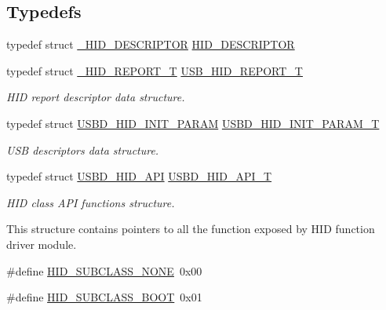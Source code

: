 \subsection*{Typedefs}
\begin{DoxyCompactItemize}
\item 
typedef struct \hyperlink{struct__HID__DESCRIPTOR}{\-\_\-\-H\-I\-D\-\_\-\-D\-E\-S\-C\-R\-I\-P\-T\-O\-R} \hyperlink{group__USBD__HID_ga683d4339556ecbba7d2062c3f90336e8}{H\-I\-D\-\_\-\-D\-E\-S\-C\-R\-I\-P\-T\-O\-R}
\item 
typedef struct \hyperlink{struct__HID__REPORT__T}{\-\_\-\-H\-I\-D\-\_\-\-R\-E\-P\-O\-R\-T\-\_\-\-T} \hyperlink{group__USBD__HID_gaaa1686adb431783ea4357e6899c0d39d}{U\-S\-B\-\_\-\-H\-I\-D\-\_\-\-R\-E\-P\-O\-R\-T\-\_\-\-T}
\begin{DoxyCompactList}\small\item\em H\-I\-D report descriptor data structure. \end{DoxyCompactList}\item 
typedef struct \hyperlink{structUSBD__HID__INIT__PARAM}{U\-S\-B\-D\-\_\-\-H\-I\-D\-\_\-\-I\-N\-I\-T\-\_\-\-P\-A\-R\-A\-M} \hyperlink{group__USBD__HID_ga192251fa5ec461eaa9a77b76dbe7c3fa}{U\-S\-B\-D\-\_\-\-H\-I\-D\-\_\-\-I\-N\-I\-T\-\_\-\-P\-A\-R\-A\-M\-\_\-\-T}
\begin{DoxyCompactList}\small\item\em U\-S\-B descriptors data structure. \end{DoxyCompactList}\item 
typedef struct \hyperlink{structUSBD__HID__API}{U\-S\-B\-D\-\_\-\-H\-I\-D\-\_\-\-A\-P\-I} \hyperlink{group__USBD__HID_ga48d7b7f66a852d99dfbe2c419cc408ba}{U\-S\-B\-D\-\_\-\-H\-I\-D\-\_\-\-A\-P\-I\-\_\-\-T}
\begin{DoxyCompactList}\small\item\em H\-I\-D class A\-P\-I functions structure.

This structure contains pointers to all the function exposed by H\-I\-D function driver module. \end{DoxyCompactList}\end{DoxyCompactItemize}
\begin{DoxyCompactItemize}
\item 
\#define \hyperlink{group__USBD__HID_ga1f7d3e3accc103eee60cb9a9162a7c49}{H\-I\-D\-\_\-\-S\-U\-B\-C\-L\-A\-S\-S\-\_\-\-N\-O\-N\-E}~0x00
\item 
\#define \hyperlink{group__USBD__HID_ga7f90b6b8acd0bce821f59ca15625da3a}{H\-I\-D\-\_\-\-S\-U\-B\-C\-L\-A\-S\-S\-\_\-\-B\-O\-O\-T}~0x01
\end{DoxyCompactItemize}
